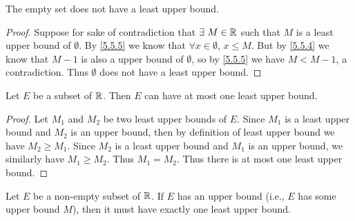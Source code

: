 \setcounter{thm}{6}
\begin{eg}\label{5.5.7}
  The empty set does not have a least upper bound.
\end{eg}

\begin{proof}
  Suppose for sake of contradiction that \(\exists\ M \in \mathbb{R}\) such that \(M\) is a least upper bound of \(\emptyset\).
  By \cref{5.5.5} we know that \(\forall x \in \emptyset\), \(x \leq M\).
  But by \cref{5.5.4} we know that \(M - 1\) is also a upper bound of \(\emptyset\), so by \cref{5.5.5} we have \(M < M - 1\), a contradiction.
  Thus \(\emptyset\) does not have a least upper bound.
\end{proof}

\begin{prop}\label{5.5.8}
  Let \(E\) be a subset of \(\mathbb{R}\).
  Then \(E\) can have at most one least upper bound.
\end{prop}

\begin{proof}
  Let \(M_1\) and \(M_2\) be two least upper bounds of \(E\).
  Since \(M_1\) is a least upper bound and \(M_2\) is an upper bound, then by definition of least upper bound we have \(M_2 \geq M_1\).
  Since \(M_2\) is a least upper bound and \(M_1\) is an upper bound, we similarly have \(M_1 \geq M_2\).
  Thus \(M_1 = M_2\).
  Thus there is at most one least upper bound.
\end{proof}

\begin{thm}\label{5.5.9}
  Let \(E\) be a non-empty subset of \(\mathbb{R}\).
  If \(E\) has an upper bound (i.e., \(E\) has some upper bound \(M\)), then it must have exactly one least upper bound.
\end{thm}

